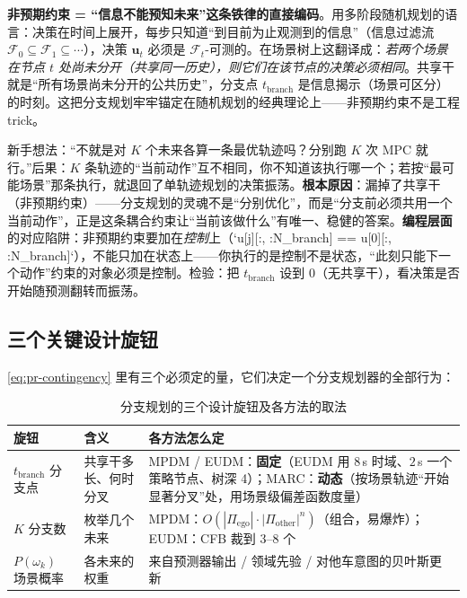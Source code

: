 \begin{insight}
\textbf{非预期约束 = “信息不能预知未来”这条铁律的直接编码}。用多阶段随机规划的语言：决策在时间上展开，每步只知道“到目前为止观测到的信息”（信息过滤流 $\mathcal{F}_0\subseteq\mathcal{F}_1\subseteq\cdots$），决策 $\mathbf{u}_t$ 必须是 $\mathcal{F}_t$-可测的。在场景树上这翻译成：\emph{若两个场景在节点 $t$ 处尚未分开（共享同一历史），则它们在该节点的决策必须相同}。共享干就是“所有场景尚未分开的公共历史”，分支点 $t_{\mathrm{branch}}$ 是信息揭示（场景可区分）的时刻。这把分支规划牢牢锚定在随机规划的经典理论上——非预期约束不是工程 trick。
\end{insight}

\begin{pitfall}
新手想法：“不就是对 $K$ 个未来各算一条最优轨迹吗？分别跑 $K$ 次 MPC 就行。”后果：$K$ 条轨迹的“当前动作”互不相同，你不知道该执行哪一个；若按“最可能场景”那条执行，就退回了单轨迹规划的决策振荡。\textbf{根本原因}：漏掉了共享干（非预期约束）——分支规划的灵魂不是“分别优化”，而是“分支前必须共用一个当前动作”，正是这条耦合约束让“当前该做什么”有唯一、稳健的答案。\textbf{编程层面}的对应陷阱：非预期约束要加在\emph{控制}上（`u[j][:, :N_branch] == u[0][:, :N_branch]`），不能只加在状态上——你执行的是控制不是状态，“此刻只能下一个动作”约束的对象必须是控制。检验：把 $t_{\mathrm{branch}}$ 设到 $0$（无共享干），看决策是否开始随预测翻转而振荡。
\end{pitfall}

\subsection{三个关键设计旋钮}
\label{sec:pr-branch-knobs}

\cref{eq:pr-contingency} 里有三个必须定的量，它们决定一个分支规划器的全部行为：

\begin{table}[H]\centering\small
\caption{分支规划的三个设计旋钮及各方法的取法}
\label{tab:pr-knobs}
\begin{tabular}{p{} p{} p{}}
\toprule
旋钮 & 含义 & 各方法怎么定 \\
\midrule
$t_{\mathrm{branch}}$ 分支点 & 共享干多长、何时分叉 & MPDM / EUDM：\textbf{固定}（EUDM 用 $8\,$s 时域、$2\,$s 一个策略节点、树深 4）；MARC：\textbf{动态}（按场景轨迹“开始显著分叉”处，用场景级偏差函数度量） \\
$K$ 分支数 & 枚举几个未来 & MPDM：$O(|\Pi_{\mathrm{ego}}|\cdot|\Pi_{\mathrm{other}}|^{n})$（组合，易爆炸）；EUDM：CFB 裁到 $3$--$8$ 个 \\
$P(\omega_k)$ 场景概率 & 各未来的权重 & 来自预测器输出 / 领域先验 / 对他车意图的贝叶斯更新 \\
\bottomrule
\end{tabular}
\end{table}

